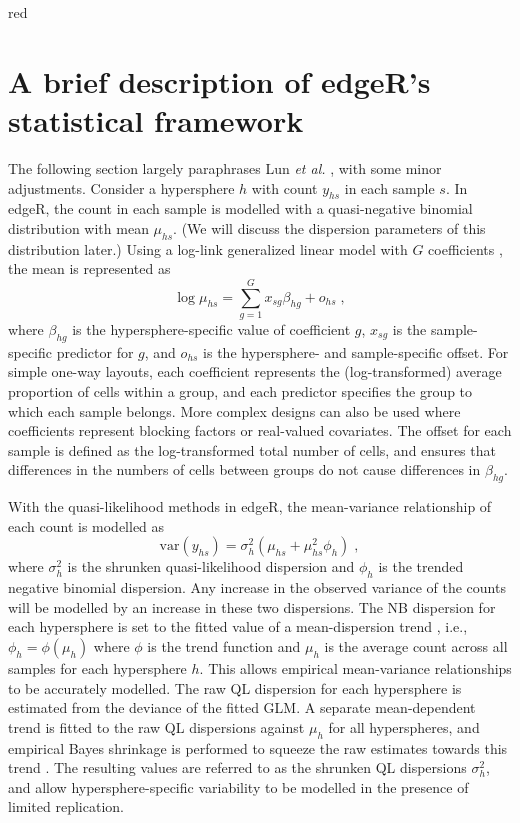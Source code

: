 \documentclass{article}
\begin{document}
\begin{color}{red}
\section{A brief description of edgeR's statistical framework}
The following section largely paraphrases Lun \textit{et al.} \cite{lun2016delicious}, with some minor adjustments.
Consider a hypersphere $h$ with count $y_{hs}$ in each sample $s$.
In edgeR, the count in each sample is modelled with a quasi-negative binomial distribution with mean $\mu_{hs}$.
(We will discuss the dispersion parameters of this distribution later.)
Using a log-link generalized linear model with $G$ coefficients \cite{mccarthy2012differential}, the mean is represented as
\[
    \log \mu_{hs} = \sum_{g=1}^G x_{sg} \beta_{hg} + o_{hs} \;,
\]
where $\beta_{hg}$ is the hypersphere-specific value of coefficient $g$, $x_{sg}$ is the sample-specific predictor for $g$, and $o_{hs}$ is the hypersphere- and sample-specific offset.
For simple one-way layouts, each coefficient represents the (log-transformed) average proportion of cells within a group, and each predictor specifies the group to which each sample belongs.
More complex designs can also be used where coefficients represent blocking factors or real-valued covariates.
The offset for each sample is defined as the log-transformed total number of cells, and ensures that differences in the numbers of cells between groups do not cause differences in $\beta_{hg}$.

With the quasi-likelihood methods in edgeR, the mean-variance relationship of each count is modelled as
\[
    \mbox{var}(y_{hs}) = \sigma^2_{h} (\mu_{hs} + \mu_{hs}^2 \phi_h) \;,
\]
where $\sigma^2_h$ is the shrunken quasi-likelihood dispersion and $\phi_h$ is the trended negative binomial dispersion.
Any increase in the observed variance of the counts will be modelled by an increase in these two dispersions.
The NB dispersion for each hypersphere is set to the fitted value of a mean-dispersion trend \cite{mccarthy2012differential}, i.e., $\phi_h = \phi(\mu_h)$ where $\phi$ is the trend function and $\mu_h$ is the average count across all samples for each hypersphere $h$.
This allows empirical mean-variance relationships to be accurately modelled.
The raw QL dispersion for each hypersphere is estimated from the deviance of the fitted GLM.
A separate mean-dependent trend is fitted to the raw QL dispersions against $\mu_h$ for all hyperspheres, and empirical Bayes shrinkage is performed to squeeze the raw estimates towards this trend \cite{lund2012detecting}.
The resulting values are referred to as the shrunken QL dispersions $\sigma^2_h$, and allow hypersphere-specific variability to be modelled in the presence of limited replication.


\end{color}
\end{document}
